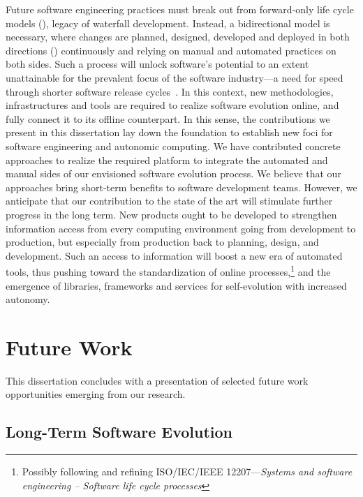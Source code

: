 Future software engineering practices must break out from forward-only life cycle models (), legacy of waterfall development. Instead, a bidirectional model is necessary, where changes are planned, designed, developed and deployed in both directions () continuously and relying on manual and automated practices on both sides. Such a process will unlock software's potential to an extent unattainable for the prevalent focus of the software industry---a need for speed through shorter software release cycles~\cite{fitzgerald-2017-continuous}. In this context, new methodologies, infrastructures and tools are required to realize software evolution online, and fully connect it to its offline counterpart. In this sense, the contributions we present in this dissertation lay down the foundation to establish new foci for software engineering and autonomic computing. We have contributed concrete approaches to realize the required platform to integrate the automated and manual sides of our envisioned software evolution process. We believe that our approaches bring short-term benefits to software development teams. However, we anticipate that our contribution to the state of the art will stimulate further progress in the long term. New products ought to be developed to strengthen information access from every computing environment going from development to production, but especially from production back to planning, design, and development. Such an access to information will boost a new era of automated tools, thus pushing toward the standardization of online processes,\footnote{Possibly following and refining ISO/IEC/IEEE 12207---\emph{Systems and software engineering -- Software life cycle processes}} and the emergence of libraries, frameworks and services for self-evolution with increased autonomy.

\section{Future Work}
\label{sect:conclusions--future-work}

This dissertation concludes with a presentation of selected future work opportunities emerging from our research.

\subsection{Long-Term Software Evolution}
\label{subsect:conclusions--fw-long-term-software-evolution}

